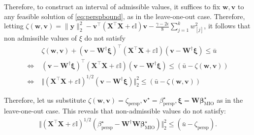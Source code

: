 \documentclass[opre,nonblindrev]{informs3} %
\begin{document}
{Therefore, to construct an interval of admissible values, it suffices to fix $\bm{w},\bm{v}$ to any feasible solution of \eqref{eq:perspbound}, as in the leave-one-out case. Therefore, letting $\zeta(\bm{w},\bm{v})=\|\bm{y}\|_2^2-\bm{v}^\top \left(\bm{X}^\top \bm{X}+\epsilon\mathbb{I}\right)\bm{v}-\frac{\gamma-2\epsilon}{8}\sum_{j=1}^k w_{[j]}^2$, it follows that non admissible values of $\xi$ do not satisfy
\begin{align*}&\zeta(\bm{w},\bm{v})+\left(\bm{v}-\bm{W}^\dag \bm{\xi}\right)^\top \left(\bm{X}^\top \bm{X}+\varepsilon\mathbb{I}\right)\left(\bm{v}-\bm{W}^\dag \bm{\xi}\right)\leq \bar u\\
\Leftrightarrow\;&\left(\bm{v}-\bm{W}^\dag \bm{\xi}\right)^\top \left(\bm{X}^\top \bm{X}+\varepsilon\mathbb{I}\right)\left(\bm{v}-\bm{W}^\dag \bm{\xi}\right)\leq \left(\bar u-\zeta(\bm{w},\bm{v})\right)\\
\Leftrightarrow\;& \Vert  \left(\bm{X}^\top \bm{X}+\varepsilon\mathbb{I}\right)^{1/2} \left(\bm{v}-\bm{W}^\dag \bm{\xi}\right)\Vert_2^2 \leq (\bar{u}-\zeta(\bm{w},\bm{v}))
\end{align*}

Therefore, let us substitute $\zeta(\bm{w}, \bm{v})=\zeta_{\text{persp}}, \bm{v}^\star= \beta_{\text{persp}}^\star, \bm{\xi}=\bm{W}\bm{\beta}^\star_{\text{MIO}}$ as in the leave-one-out case. This reveals that non-admissible values do not satisfy:
\begin{align}
    \Vert \left(\bm{X}^\top \bm{X}+\varepsilon \mathbb{I}\right)^{1/2} (\beta^\star_{\text{persp}}- \bm{W}^\dag \bm{W}\bm{\beta}^\star_{\text{MIO}})\Vert_2^2 \leq (\bar{u}-\zeta_{\text{persp}}).
\end{align}
\Halmos \endproof

}
\end{document}
